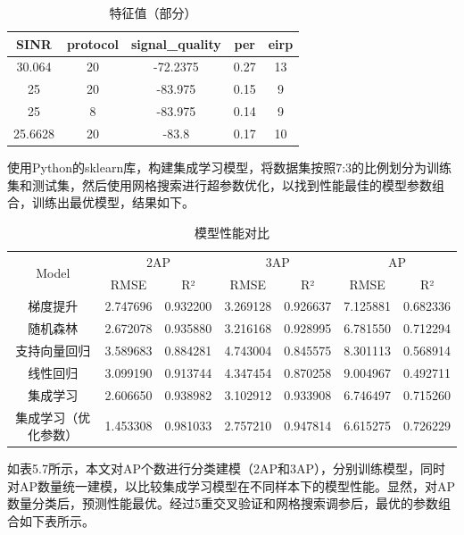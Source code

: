 \begin{table}[H]
	\centering
	\caption{特征值（部分）}
	\begin{tabular}{ccccc} %
		\toprule
		SINR & protocol & signal\_quality &  per & eirp\\ 
		\midrule
		 30.064 & 20 & -72.2375 &  0.27 & 13 \\
		 25 & 20 & -83.975 &  0.15 & 9 \\
	 	 25 & 8 & -83.975 &  0.14 & 9 \\
		 25.6628 & 20 & -83.8 &  0.17 & 10 \\
		\bottomrule
	\end{tabular}
\end{table}

使用Python的sklearn库，构建集成学习模型，将数据集按照7:3的比例划分为训练集和测试集，然后使用网格搜索进行超参数优化，以找到性能最佳的模型参数组合，训练出最优模型，结果如下。


\begin{table}[H]
	\centering
	\caption{模型性能对比}
	\begin{tabular}{@{}ccccccc@{}}
		\toprule
		\multirow{2}{*}{Model} & \multicolumn{2}{c}{2AP} & \multicolumn{2}{c}{3AP} & \multicolumn{2}{c}{AP} \\ 
		\cmidrule{2-3}
		\cmidrule{4-5}
		\cmidrule{6-7}
		& RMSE & R² & RMSE & R² & RMSE & R² \\ 
		\midrule
		梯度提升 & 2.747696 & 0.932200 & 3.269128 & 0.926637 & 7.125881 & 0.682336 \\
		随机森林 & 2.672078 & 0.935880 & 3.216168 & 0.928995 & 6.781550 & 0.712294 \\
		支持向量回归 & 3.589683 & 0.884281 & 4.743004 & 0.845575 & 8.301113 & 0.568914 \\
		线性回归 & 3.099190 & 0.913744 & 4.347454 & 0.870258 & 9.004967 & 0.492711 \\
		集成学习 & 2.606650 & 0.938982 & 3.102912 & 0.933908 & 6.746497 & 0.715260 \\
		集成学习（优化参数） & 1.453308 & 0.981033 & 2.757210 & 0.947814 & 6.615275 & 0.726229 \\ 
		\bottomrule
	\end{tabular}
\end{table}










如表5.7所示，本文对AP个数进行分类建模（2AP和3AP），分别训练模型，同时对AP数量统一建模，以比较集成学习模型在不同样本下的模型性能。显然，对AP数量分类后，预测性能最优。经过5重交叉验证和网格搜索调参后，最优的参数组合如下表所示。

